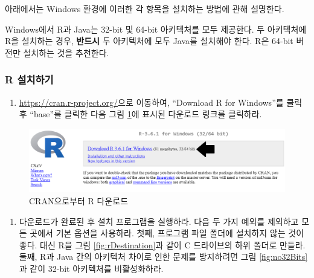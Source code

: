 \documentclass[10.5pt]{book}
\providecommand{\tightlist}{%
  \setlength{\itemsep}{0pt}\setlength{\parskip}{0pt}}
\theoremstyle{definition}
\theoremstyle{definition}
\theoremstyle{definition}
\theoremstyle{remark}
\let\BeginKnitrBlock\begin \let\EndKnitrBlock\end
\begin{document}
아래에서는 Windows 환경에 이러한 각 항목을 설치하는 방법에 관해
설명한다.

\BeginKnitrBlock{rmdimportant}
Windows에서 R과 Java는 32-bit 및 64-bit 아키텍처를 모두 제공한다. 두
아키텍처에 R을 설치하는 경우, \textbf{반드시} 두 아키텍처에 모두 Java를
설치해야 한다. R은 64-bit 버전만 설치하는 것을 추천한다.
\EndKnitrBlock{rmdimportant}

\subsubsection*{R 설치하기}\label{r-}

\begin{enumerate}
\def\labelenumi{\arabic{enumi}.}
\tightlist
\item
  \url{https://cran.r-project.org/}으로 이동하여, ``Download R for
  Windows''를 클릭 후 ``base''를 클릭한 다음 그림 \ref{fig:downloadR}에
  표시된 다운로드 링크를 클릭하라.
\end{enumerate}

\begin{figure}

{\centering \includegraphics[width=1\linewidth]{images/OhdsiAnalyticsTools/downloadR} 

}

\caption{CRAN으로부터 R 다운로드}\label{fig:downloadR}
\end{figure}

\begin{enumerate}
\def\labelenumi{\arabic{enumi}.}
\setcounter{enumi}{1}
\tightlist
\item
  다운로드가 완료된 후 설치 프로그램을 실행하라. 다음 두 가지 예외를
  제외하고 모든 곳에서 기본 옵션을 사용하라. 첫째, 프로그램 파일 폴더에
  설치하지 않는 것이 좋다. 대신 R을 그림 \ref{fig:rDestination}과 같이 C
  드라이브의 하위 폴더로 만들라. 둘째, R과 Java 간의 아키텍처 차이로
  인한 문제를 방지하려면 그림 \ref{fig:no32Bits}과 같이 32-bit
  아키텍처를 비활성화하라.
\end{enumerate}
\end{document}
